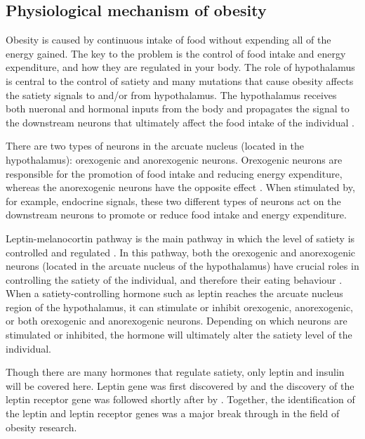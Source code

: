 
\subsection{Physiological mechanism of obesity}
\label{sub:physiological_mechanism_of_obesity}

Obesity is caused by continuous intake of food without expending all of the energy gained.
The key to the problem is the control of food intake and energy expenditure, and how they are regulated in your body.
The role of hypothalamus is central to the control of satiety and many mutations that cause obesity affects the satiety signals to and/or from hypothalamus.
The hypothalamus receives both nueronal and hormonal inputs from the body and propagates the signal to the downstream neurons that ultimately affect the food intake of the individual \citep{Bell2005, Spiegelman2001}.

There are two types of neurons in the arcuate nucleus (located in the hypothalamus): orexogenic and anorexogenic neurons.
Orexogenic neurons are responsible for the promotion of food intake and reducing energy expenditure, whereas the anorexogenic neurons have the opposite effect \citep{Barsh2002}.
When stimulated by, for example, endocrine signals, these two different types of neurons act on the downstream neurons to promote or reduce food intake and energy expenditure.

Leptin-melanocortin pathway is the main pathway in which the level of satiety is controlled and regulated \citep{Spiegelman2001}.
In this pathway, both the orexogenic and anorexogenic neurons (located in the arcuate nucleus of the hypothalamus) have crucial roles in controlling the satiety of the individual, and therefore their eating behaviour \citep{Barsh2002,Bell2005}.
When a satiety-controlling hormone such as leptin reaches the arcuate nucleus region of the hypothalamus, it can stimulate or inhibit orexogenic, anorexogenic, or both orexogenic and anorexogenic neurons.
Depending on which neurons are stimulated or inhibited, the hormone will ultimately alter the satiety level of the individual.

Though there are many hormones that regulate satiety, only leptin and insulin will be covered here.
Leptin gene was first discovered by \citet{Zhang1994} and the discovery of the leptin receptor gene was followed shortly after by \citet{Tartaglia1995}.
Together, the identification of the leptin and leptin receptor genes was a major break through in the field of obesity research.

